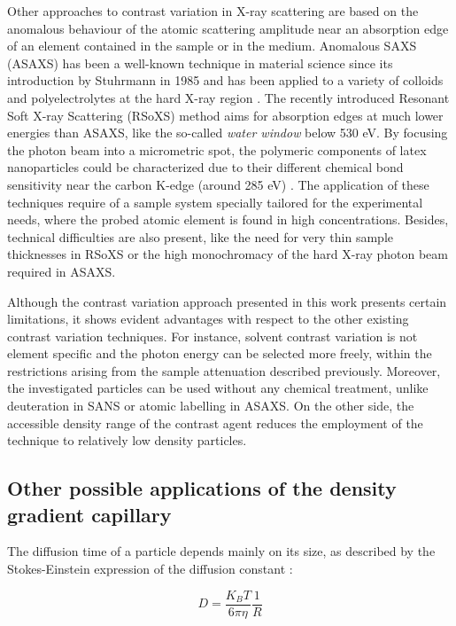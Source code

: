 Other approaches to contrast variation in X-ray scattering are based on the anomalous behaviour of the atomic scattering amplitude near an absorption edge of an element contained in the sample or in the medium. Anomalous SAXS (ASAXS) has been a well-known technique in material science since its introduction by Stuhrmann in 1985 \citep{stuhrmann_resonance_1985} and has been applied to a variety of colloids and polyelectrolytes at the hard X-ray region \citep{goerigk_anomalous_2003, stuhrmann_contrast_2007,lages_saxs_2013}. The recently introduced Resonant Soft X-ray Scattering (RSoXS) method aims for absorption edges at much lower energies than ASAXS, like the so-called \emph{water window} below 530 eV. By focusing the photon beam into a micrometric spot, the polymeric components of latex nanoparticles could be characterized due to their different chemical bond sensitivity near the carbon K-edge (around 285 eV) \citep{mitchell_molecular_2006,araki_resonant_2006-1}. The application of these techniques require of a sample system specially tailored for the experimental needs, where the probed atomic element is found in high concentrations. Besides, technical difficulties are also present, like the need for very thin sample thicknesses in RSoXS or the high monochromacy of the hard X-ray photon beam required in ASAXS.

Although the contrast variation approach presented in this work presents certain limitations, it shows evident advantages with respect to the other existing contrast variation techniques. For instance, solvent contrast variation is not element specific and the photon energy can be selected more freely, within the restrictions arising from the sample attenuation described previously. Moreover, the investigated particles can be used without any chemical treatment, unlike deuteration in SANS or atomic labelling in ASAXS. On the other side, the accessible density range of the contrast agent reduces the employment of the technique to relatively low density particles.

\subsection{Other possible applications of the density gradient capillary}

The diffusion time of a particle depends mainly on its size, as described by the Stokes-Einstein expression of the diffusion constant \citep{einstein_uber_1905}:

\begin{equation}
        D=\frac{K_B T}{6\pi \eta }\frac{1}{R}
\end{equation}

